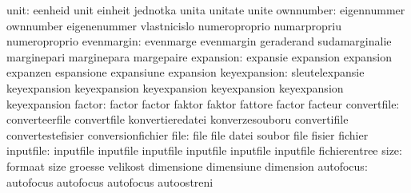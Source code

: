                      unit: eenheid                   unit
                           einheit                   jednotka
                           unita                     unitate
                           unite
                ownnumber: eigennummer               ownnumber
                           eigenenummer              vlastnicislo
                           numeroproprio             numarpropriu
                           numeroproprio
               evenmargin: evenmarge                 evenmargin
                           geraderand                sudamarginalie
                           marginepari               marginepara
                           margepaire
                expansion: expansie                  expansion
                           expansion                 expanzen
                           espansione                expansiune
                           expansion
             keyexpansion: sleutelexpansie           keyexpansion
                           keyexpansion              keyexpansion
                           keyexpansion              keyexpansion
                           keyexpansion
                   factor: factor                    factor
                           faktor                    faktor
                           fattore                   factor
                           facteur
              convertfile: converteerfile            convertfile
                           konvertieredatei          konverzesouboru
                           convertifile              convertestefisier
                           conversionfichier
                     file: file                      file
                           datei                     soubor
                           file                      fisier
                           fichier
                inputfile: inputfile                 inputfile
                           inputfile                 inputfile
                           inputfile                 inputfile
                           fichierentree
                     size: formaat                   size
                           groesse                   velikost
                           dimensione                dimensiune
                           dimension
                autofocus: autofocus                 autofocus
                           autofocus                 autoostreni
